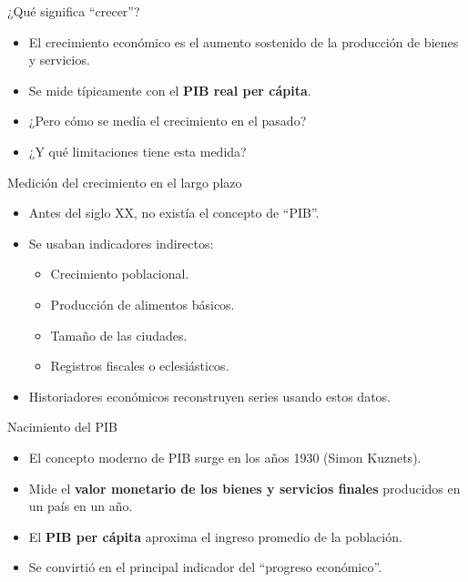 \documentclass{beamer}
\begin{document}
\begin{frame}{¿Qué significa “crecer”?}
    \begin{itemize}
        \item El crecimiento económico es el aumento sostenido de la producción de bienes y servicios.
        \item Se mide típicamente con el \textbf{PIB real per cápita}.
        \item ¿Pero cómo se medía el crecimiento en el pasado?
        \item ¿Y qué limitaciones tiene esta medida?
    \end{itemize}
\end{frame}

\begin{frame}{Medición del crecimiento en el largo plazo}
    \begin{itemize}
        \item Antes del siglo XX, no existía el concepto de “PIB”.
        \item Se usaban indicadores indirectos: 
        \begin{itemize}
            \item Crecimiento poblacional.
            \item Producción de alimentos básicos.
            \item Tamaño de las ciudades.
            \item Registros fiscales o eclesiásticos.
        \end{itemize}
        \item Historiadores económicos reconstruyen series usando estos datos.
    \end{itemize}
\end{frame}

\begin{frame}{Nacimiento del PIB}
    \begin{itemize}
        \item El concepto moderno de PIB surge en los años 1930 (Simon Kuznets).
        \item Mide el \textbf{valor monetario de los bienes y servicios finales} producidos en un país en un año.
        \item El \textbf{PIB per cápita} aproxima el ingreso promedio de la población.
        \item Se convirtió en el principal indicador del “progreso económico”.
    \end{itemize}
\end{frame}
\end{document}
